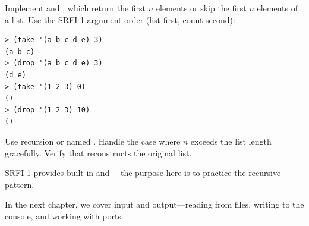 \begin{exercise}
Implement  and , which return the first $n$ elements or skip the first $n$ elements of a list. Use the SRFI-1 argument order (list first, count second):

\begin{lstlisting}[style=repl]
> (take '(a b c d e) 3)
(a b c)
> (drop '(a b c d e) 3)
(d e)
> (take '(1 2 3) 0)
()
> (drop '(1 2 3) 10)
()
\end{lstlisting}

Use recursion or named . Handle the case where $n$ exceeds the list length gracefully. Verify that  reconstructs the original list.

SRFI-1 provides built-in  and ---the purpose here is to practice the recursive pattern.
\end{exercise}

In the next chapter, we cover input and output---reading from files, writing to the console, and working with ports.

\chapterend

